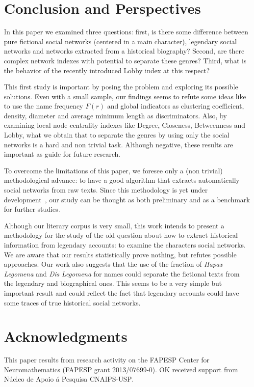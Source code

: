 \documentclass[review]{elsarticle}
\begin{document}
\section{Conclusion and Perspectives}

In this paper we examined  three questions:  first, is there
some difference  between  pure  fictional  social  networks
(centered in a main character), legendary social networks
and  networks  extracted from  a historical  biography?
Second, are there complex network indexes 
with potential to separate these genres? Third,  what  is the
behavior of the  recently introduced Lobby index at this respect?

This first study is important by posing the problem and
exploring its possible solutions.
Even with a small sample, our findings seems 
to refute some ideas like to use the
name frequency $F(r)$ and global indicators as 
clustering coefficient, density, 
diameter and average minimum length as discriminators. 
Also, by examining local node centrality indexes like 
Degree, Closeness, Betweenness and Lobby,
what we obtain that to separate the genres by
using only the social networks is a hard and non trivial task.
Although negative, these results are important as guide
for future research.

To overcome the limitations of this paper, 
we foresee only a (non trivial)
methodological advance: to have a good algorithm that 
extracts automatically social networks from raw texts. 
Since this methodology is yet under
development~\cite{elson2010,grayson2016}, 
our study can be thought as both 
preliminary and as a benchmark for further studies.

Although our literary corpus is very small, this work
intends to present a methodology for the study of the
old question about how to extract historical information from
legendary accounts: to examine the characters social networks. 
We are aware that our results statistically 
prove nothing, but refutes possible approaches.
Our work also suggests  that the
use of the fraction of \emph{Hapax Legomena} and \emph{Dis Legomena}
for names could separate the fictional texts from the legendary and
biographical ones.  
This seems to be a very simple but important result and could reflect
the fact that legendary accounts could have some traces
of true historical social networks.

\section*{Acknowledgments}
This paper results from research activity on the 
FAPESP Center for Neuromathematics (FAPESP grant 2013/07699-0). 
OK received support from N\'ucleo de Apoio \'a Pesquisa 
CNAIPS-USP. 
\end{document}
